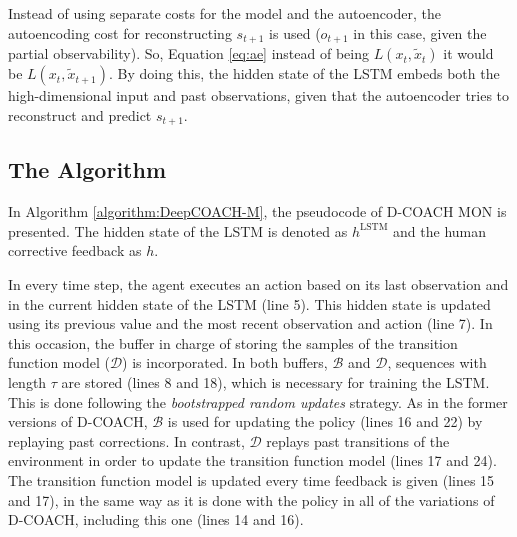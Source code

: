 Instead of using separate costs for the model and the autoencoder, the autoencoding cost for reconstructing $s_{t+1}$ is used ($o_{t+1}$ in this case, given the partial observability). So, Equation \ref{eq:ae} instead of being $L(x_{t},\widetilde x_{t})$ it would be  $L(x_{t},\widetilde x_{t+1})$. By doing this, the hidden state of the LSTM embeds both the high-dimensional input and past observations, given that the autoencoder tries to reconstruct and predict $s_{t+1}$.

\subsection{The Algorithm}

In Algorithm \ref{algorithm:DeepCOACH-M}, the pseudocode of D-COACH MON is presented. The hidden state of the LSTM is denoted as  $h^{\mathrm{LSTM}}$ and the human corrective feedback as $h$.

 In every time step, the agent executes an action based on its last observation and in the current hidden state of the LSTM (line 5). This hidden state is updated using its previous value and the most recent observation and action (line 7). In this occasion, the buffer in charge of storing the samples of the transition function model ($\mathcal{D}$) is incorporated. In both buffers, $\mathcal{B}$ and $\mathcal{D}$, sequences with length $\tau$ are stored (lines 8 and 18), which is necessary for training the LSTM. This is done following the \emph{bootstrapped random updates} \cite{hausknecht2015deep} strategy. As in the former versions of D-COACH, $\mathcal{B}$ is used for updating the policy (lines 16 and 22) by replaying past corrections. In contrast, $\mathcal{D}$ replays past transitions of the environment in order to update the transition function model (lines 17 and 24). The transition function model is updated every time feedback is given (lines 15 and 17), in the same way as it is done with the policy in all of the variations of D-COACH, including this one (lines 14 and 16). 

